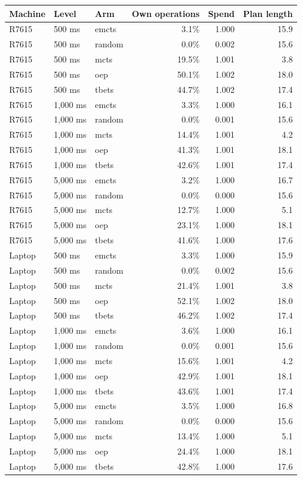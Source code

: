 \begin{tabular}{lllrrr}
\toprule
Machine & Level & Arm & Own operations & Spend & Plan length \\
\midrule
R7615 & 500 ms & emcts & 3.1\% & 1.000 & 15.9 \\
R7615 & 500 ms & random & 0.0\% & 0.002 & 15.6 \\
R7615 & 500 ms & mcts & 19.5\% & 1.001 & 3.8 \\
R7615 & 500 ms & oep & 50.1\% & 1.002 & 18.0 \\
R7615 & 500 ms & tbets & 44.7\% & 1.002 & 17.4 \\
R7615 & 1,000 ms & emcts & 3.3\% & 1.000 & 16.1 \\
R7615 & 1,000 ms & random & 0.0\% & 0.001 & 15.6 \\
R7615 & 1,000 ms & mcts & 14.4\% & 1.001 & 4.2 \\
R7615 & 1,000 ms & oep & 41.3\% & 1.001 & 18.1 \\
R7615 & 1,000 ms & tbets & 42.6\% & 1.001 & 17.4 \\
R7615 & 5,000 ms & emcts & 3.2\% & 1.000 & 16.7 \\
R7615 & 5,000 ms & random & 0.0\% & 0.000 & 15.6 \\
R7615 & 5,000 ms & mcts & 12.7\% & 1.000 & 5.1 \\
R7615 & 5,000 ms & oep & 23.1\% & 1.000 & 18.1 \\
R7615 & 5,000 ms & tbets & 41.6\% & 1.000 & 17.6 \\
Laptop & 500 ms & emcts & 3.3\% & 1.000 & 15.9 \\
Laptop & 500 ms & random & 0.0\% & 0.002 & 15.6 \\
Laptop & 500 ms & mcts & 21.4\% & 1.001 & 3.8 \\
Laptop & 500 ms & oep & 52.1\% & 1.002 & 18.0 \\
Laptop & 500 ms & tbets & 46.2\% & 1.002 & 17.4 \\
Laptop & 1,000 ms & emcts & 3.6\% & 1.000 & 16.1 \\
Laptop & 1,000 ms & random & 0.0\% & 0.001 & 15.6 \\
Laptop & 1,000 ms & mcts & 15.6\% & 1.001 & 4.2 \\
Laptop & 1,000 ms & oep & 42.9\% & 1.001 & 18.1 \\
Laptop & 1,000 ms & tbets & 43.6\% & 1.001 & 17.4 \\
Laptop & 5,000 ms & emcts & 3.5\% & 1.000 & 16.8 \\
Laptop & 5,000 ms & random & 0.0\% & 0.000 & 15.6 \\
Laptop & 5,000 ms & mcts & 13.4\% & 1.000 & 5.1 \\
Laptop & 5,000 ms & oep & 24.4\% & 1.000 & 18.1 \\
Laptop & 5,000 ms & tbets & 42.8\% & 1.000 & 17.6 \\
\bottomrule
\end{tabular}
